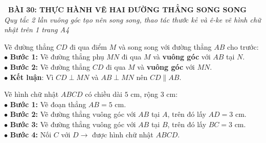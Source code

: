 \documentclass[14pt,a4paper,oneside]{extbook}
\begin{document}
\noindent
\begin{tcolorbox}[
  enhanced,
  colback=teal!8!white,
  colframe=teal!80!black,
  arc=3mm, boxrule=1pt,
  left=3mm, right=3mm, top=2mm, bottom=2mm,
  halign=center
]
  {\Large\bfseries\color{teal!90!black}\faBookmark\ BÀI 30: THỰC HÀNH VẼ HAI ĐƯỜNG THẲNG SONG SONG}\\[1.5pt]
  {\footnotesize\itshape\color{black!75} Quy tắc 2 lần vuông góc tạo nên song song, thao tác thước kẻ và ê-ke vẽ hình chữ nhật trên 1 trang A4}
\end{tcolorbox}

\vspace{2mm}

\noindent
\begin{minipage}[t]{0.49\textwidth}
  \begin{tcolorbox}[
    enhanced,
    title={\footnotesize\bfseries\color{white}\faPencil\ 1. Quy trình vẽ đường thẳng song song},
    colback=blue!2!white,
    colframe=blue!75!black,
    arc=2.5mm, boxrule=0.8pt, top=1.8mm, bottom=1.8mm, left=2mm, right=2mm
  ]
    \footnotesize
    Vẽ đường thẳng $CD$ đi qua điểm $M$ và song song với đường thẳng $AB$ cho trước:\\
    $\bullet$ \textbf{Bước 1:} Vẽ đường thẳng phụ $MN$ đi qua $M$ và \textbf{vuông góc} với $AB$ tại $N$.\\
    $\bullet$ \textbf{Bước 2:} Vẽ đường thẳng $CD$ đi qua $M$ và \textbf{vuông góc} với $MN$.\\
    $\bullet$ \textbf{Kết luận}: Vì $CD \perp MN$ và $AB \perp MN$ nên $CD \parallel AB$.
  \end{tcolorbox}
\end{minipage}%
\hfill
\begin{minipage}[t]{0.49\textwidth}
  \begin{tcolorbox}[
    enhanced,
    title={\footnotesize\bfseries\color{white}\faThLarge\ 2. Ứng dụng: Vẽ hình chữ nhật},
    colback=teal!2!white,
    colframe=teal!75!black,
    arc=2.5mm, boxrule=0.8pt, top=1.8mm, bottom=1.8mm, left=2mm, right=2mm
  ]
    \footnotesize
    Vẽ hình chữ nhật $ABCD$ có chiều dài $5\text{ cm}$, rộng $3\text{ cm}$:\\
    $\bullet$ \textbf{Bước 1:} Vẽ đoạn thẳng $AB = 5\text{ cm}$.\\
    $\bullet$ \textbf{Bước 2:} Vẽ đường thẳng vuông góc với $AB$ tại $A$, trên đó lấy $AD = 3\text{ cm}$.\\
    $\bullet$ \textbf{Bước 3:} Vẽ đường thẳng vuông góc với $AB$ tại $B$, trên đó lấy $BC = 3\text{ cm}$.\\
    $\bullet$ \textbf{Bước 4:} Nối $C$ với $D \rightarrow$ được hình chữ nhật $ABCD$.
  \end{tcolorbox}
\end{minipage}
\end{document}
